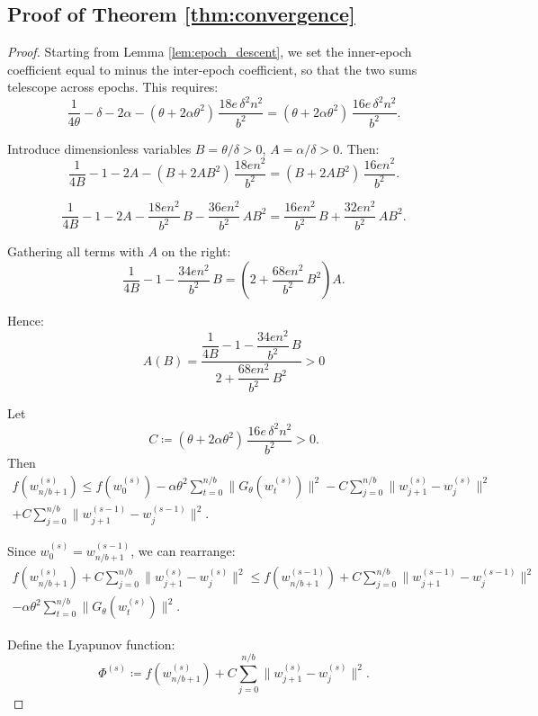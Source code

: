 \documentclass{article}
\begin{document}
\subsection{Proof of Theorem \ref{thm:convergence}} 
\label{app:proof_theorem}
\begin{proof}

Starting from Lemma \ref{lem:epoch_descent}, we set the inner-epoch 
coefficient equal to minus the inter-epoch coefficient, so that 
the two sums telescope across epochs. This requires:
\[
\frac{1}{4\theta} - \delta - 2\alpha 
- (\theta + 2\alpha\theta^2)\,\frac{18e\,\delta^2 n^2}{b^2} 
= (\theta + 2\alpha\theta^2)\,\frac{16e\,\delta^2 n^2}{b^2}.
\]

Introduce dimensionless variables $B = \theta/\delta > 0$, 
$A = \alpha/\delta > 0$. Then:
\[
\frac{1}{4B} - 1 - 2A 
- (B + 2AB^2)\,\frac{18en^2}{b^2} 
= (B + 2AB^2)\,\frac{16en^2}{b^2}.
\]

\[
\frac{1}{4B} - 1 - 2A 
- \frac{18en^2}{b^2}\,B - \frac{36en^2}{b^2}\,AB^2 
= \frac{16en^2}{b^2}\,B + \frac{32en^2}{b^2}\,AB^2.
\]

Gathering all terms with $A$ on the right:
\[
\frac{1}{4B} - 1 - \frac{34en^2}{b^2}\,B 
= \left(2 + \frac{68en^2}{b^2}\,B^2\right) A.
\]

Hence:
\begin{equation}
\label{eq:A-of-B}
A(B) = \frac{\dfrac{1}{4B} - 1 
  - \dfrac{34en^2}{b^2}\,B}
{2 + \dfrac{68en^2}{b^2}\,B^2} > 0
\end{equation}

Let
\[
C \coloneqq (\theta + 2\alpha\theta^2)\,
\frac{16e\,\delta^2 n^2}{b^2} > 0.
\]
Then 
\begin{multline*}
f(w_{n/b+1}^{(s)}) \leq f(w_0^{(s)}) 
- \alpha\theta^2\sum_{t=0}^{n/b}\|G_\theta(w_t^{(s)})\|^2 
- C\sum_{j=0}^{n/b}\|w_{j+1}^{(s)} - w_j^{(s)}\|^2 \\
+ C\sum_{j=0}^{n/b}\|w_{j+1}^{(s-1)} - w_j^{(s-1)}\|^2.
\end{multline*}

Since $w_0^{(s)} = w_{n/b+1}^{(s-1)}$, 
we can rearrange:
\begin{multline*}
f(w_{n/b+1}^{(s)}) 
+ C\sum_{j=0}^{n/b}\|w_{j+1}^{(s)} - w_j^{(s)}\|^2 
\leq f(w_{n/b+1}^{(s-1)}) 
+ C\sum_{j=0}^{n/b}\|w_{j+1}^{(s-1)} - w_j^{(s-1)}\|^2 \\
- \alpha\theta^2\sum_{t=0}^{n/b}
\|G_\theta(w_t^{(s)})\|^2.
\end{multline*}

Define the Lyapunov function:
\[
\Phi^{(s)} \coloneqq f(w_{n/b+1}^{(s)}) 
+ C\sum_{j=0}^{n/b}\|w_{j+1}^{(s)} - w_j^{(s)}\|^2.
\]


\end{proof}
\end{document}
